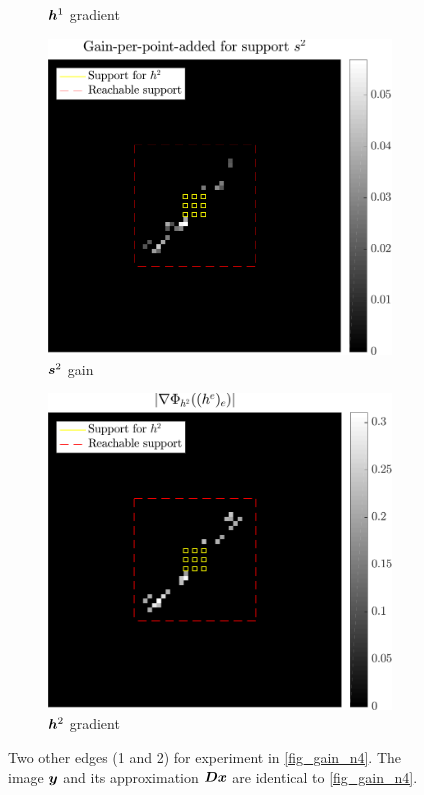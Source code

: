 \begin{figure}[!ht]
\begin{subfigure}[b]{0.24\linewidth}
	\caption{$\bm{h}^1$ gradient}
	\end{subfigure}
	\begin{subfigure}[b]{0.24\linewidth}\centering
	\includegraphics[width=\linewidth]{figures/xp/n2/xp_128x128_sc2_angl1_K3_S3_node2_objmatrix_bestvalues.pdf}
	\caption{$\bm{s}^2$ gain}
	\end{subfigure}
	\begin{subfigure}[b]{0.24\linewidth}\centering
	\includegraphics[width=\linewidth]{figures/xp/n2/xp_128x128_sc2_angl1_K3_S3_node2_partgrad2_bestvalues.pdf}
	\caption{$\bm{h}^2$ gradient}
	\end{subfigure}
\caption{Two other edges (1 and 2) for experiment in \cref{fig_gain_n4}. The image $\bm{y}$ and its approximation $\bm{D}\bm{x}$ are identical to \cref{fig_gain_n4}.}\label{fig_gain_n1_n2}
\end{figure}

